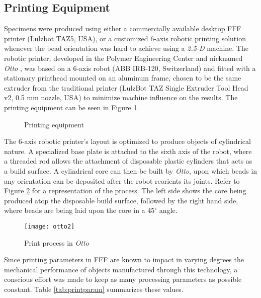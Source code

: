 \documentclass[main.tex]{subfiles}
\begin{document}
\subsection{Printing Equipment}
Specimens were produced using either a commercially available desktop FFF printer (Lulzbot TAZ5, USA), or a customized 6-axis robotic printing solution whenever the bead orientation was hard to achieve using a \emph{2.5-D} machine. The robotic printer, developed in the Polymer Engineering Center and nicknamed \emph{Otto} \cite{VanHulle2017}, was based on a 6-axis robot (ABB IRB-120, Switzerland) and fitted with a stationary printhead mounted on an aluminum frame, chosen to be the same extruder from the traditional printer (LulzBot TAZ Single Extruder Tool Head v2, 0.5 mm nozzle, USA) to minimize machine influence on the results. The printing equipment can be seen in Figure \ref{fig:PrintEquip}. 
\begin{figure}[h]
	\center
	\hfill
	\caption{Printing equipment} \label{fig:PrintEquip}
\end{figure}

The 6-axis robotic printer's layout is optimized to produce objects of cylindrical nature. A specialized base plate is attached to the sixth axis of the robot, where a threaded rod allows the attachment of disposable plastic cylinders that acts as a build surface. A cylindrical core can then be built by \emph{Otto}, upon which beads in any orientation can be deposited after the robot reorients its joints. Refer to Figure \ref{fig:otto2} for a representation of the process. The left side shows the core being produced atop the disposable build surface, followed by the right hand side, where beads are being laid upon the core in a 45$^\circ$ angle.  
\begin{figure}[h]
	\center
	\texttt{[image: otto2]}
	\caption{Print process in \emph{Otto}} \label{fig:otto2}
\end{figure}

Since printing parameters in FFF are known to impact in varying degrees the mechanical performance of objects manufactured through this technology, a conscious effort was made to keep as many processing parameters as possible constant. Table \ref{tab:printparam} summarizes these values.
\end{document}
